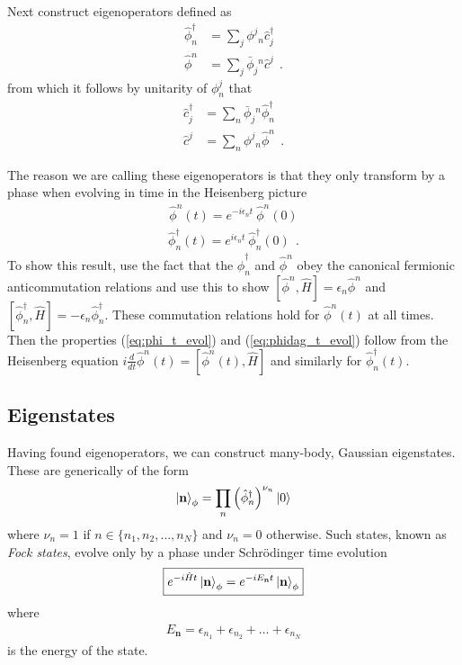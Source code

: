 \documentclass[aps, superscriptaddress, floatfix, onecolumn]{revtex4-2}
\begin{document}
Next construct eigenoperators defined as
\begin{align}
\hat{\phi}^\dagger_n & = \sum_j \phi^j\!_n \hat{c}^\dagger_j \label{eq:phidag_op} \\ 
\hat{\phi}^n & = \sum_j \bar{\phi}_j\!^n \hat{c}^j \label{eq:phi_op}  \ \ .
\end{align}
from which it follows by unitarity of $\phi^j_n$ that 
\begin{align}
\hat{c}^\dagger_j & = \sum_n \bar{\phi}_j\!^n \hat{\phi}^\dagger_n  \label{eq:cdag_phi_transform} \\ 
\hat{c}^j & = \sum_n \phi^j\!_n \hat{\phi}^n \ \ . \label{eq:c_phi_transform}
\end{align}

The reason we are calling these eigenoperators is that they only transform by a phase when evolving in time in the Heisenberg picture
\begin{align}
\boxed{\hat{\phi}^n(t) =  e^{-i \epsilon_n t}\ \hat{\phi}^n(0)} \label{eq:phi_t_evol}
\end{align}
\begin{align}
\boxed{\hat{\phi}^\dagger_n(t) =  e^{i \epsilon_n t}\ \hat{\phi}^\dagger_n(0)} \label{eq:phidag_t_evol} \ \ .
\end{align}
To show this result, use the fact that the $\hat{\phi}^\dagger_n$ and $\hat{\phi}^n$ obey the canonical fermionic anticommutation relations and use this to show $[\hat{\phi}^n, \hat{H}] = \epsilon_n \hat{\phi}^n$ and $[\hat{\phi}^\dagger_n, \hat{H}] = -\epsilon_n \hat{\phi}^\dagger_n$. These commutation relations hold for $\hat{\phi}^n(t)$ at all times. Then the properties (\ref{eq:phi_t_evol}) and (\ref{eq:phidag_t_evol}) follow from the Heisenberg equation $i \frac{d}{dt} \hat{\phi}^n(t) = [\hat{\phi}^n(t), \hat{H}]$ and similarly for $\hat{\phi}^\dagger_n(t)$.

\subsection{Eigenstates}

Having found eigenoperators, we can construct many-body, Gaussian eigenstates. These are generically of the form
\begin{align}
\ket{\mathbf{n}}_\phi = \prod_{n} \left(\hat{\phi}^\dagger_n \right)^{\nu_n} \ket{0}  
\end{align}
where $\nu_n = 1$ if $n \in \{n_1, n_2, \ldots, n_N \}$ and $\nu_n = 0$ otherwise. Such states, known as \emph{Fock states}, 
evolve only by a phase under Schr\"odinger time evolution
\begin{align}
\boxed{e^{-i \hat{H} t} \ket{\mathbf{n}}_\phi  = e^{-i E_\mathbf{n} t}  \ket{\mathbf{n}}_\phi }
\end{align}
where 
\begin{align}
\boxed{E_\mathbf{n}  = \epsilon_{n_1} + \epsilon_{n_2} + \ldots + \epsilon_{n_N}} \label{eq:fock_energy}
\end{align}
 is the energy of the state.
 
\end{document}
